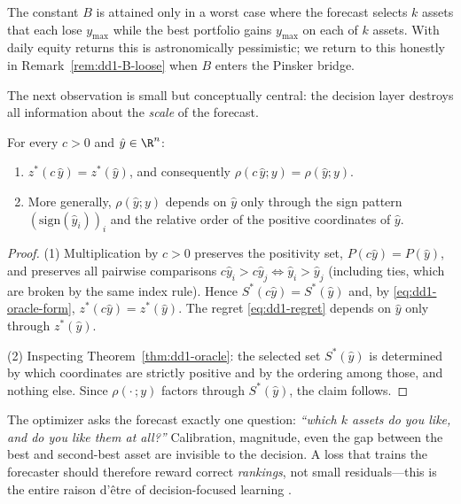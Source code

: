 \begin{remark}
The constant $B$ is attained only in a worst case where the forecast selects
$k$ assets that each lose $y_{\max}$ while the best portfolio gains $y_{\max}$
on each of $k$ assets. With daily equity returns this is astronomically
pessimistic; we return to this honestly in
Remark~\ref{rem:dd1-B-loose} when $B$ enters the Pinsker bridge.
\end{remark}

The next observation is small but conceptually central: the decision layer
destroys all information about the \emph{scale} of the forecast.

\begin{proposition}
\label{prop:dd1-scale-invariance}
For every $c > 0$ and $\hat{y} \in \R^n$:
\begin{enumerate}
\item $z^*(c\,\hat{y}) = z^*(\hat{y})$, and consequently
$\rho(c\,\hat{y}; y) = \rho(\hat{y}; y)$.
\item More generally, $\rho(\hat{y}; y)$ depends on $\hat{y}$ only through
the sign pattern $(\mathrm{sign}(\hat{y}_i))_{i}$ and the relative order of
the positive coordinates of $\hat{y}$.
\end{enumerate}
\end{proposition}

\begin{proof}
(1) Multiplication by $c > 0$ preserves the positivity set,
$P(c\hat{y}) = P(\hat{y})$, and preserves all pairwise comparisons
$c\hat{y}_i > c\hat{y}_j \iff \hat{y}_i > \hat{y}_j$ (including ties, which
are broken by the same index rule). Hence $S^*(c\hat{y}) = S^*(\hat{y})$ and,
by \eqref{eq:dd1-oracle-form}, $z^*(c\hat{y}) = z^*(\hat{y})$. The regret
\eqref{eq:dd1-regret} depends on $\hat{y}$ only through $z^*(\hat{y})$.

(2) Inspecting Theorem~\ref{thm:dd1-oracle}: the selected set $S^*(\hat{y})$
is determined by which coordinates are strictly positive and by the ordering
among those, and nothing else. Since $\rho(\cdot\,; y)$ factors through
$S^*(\hat{y})$, the claim follows.
\end{proof}

\begin{intuition}
The optimizer asks the forecast exactly one question: \emph{``which $k$ assets
do you like, and do you like them at all?''} Calibration, magnitude, even the
gap between the best and second-best asset are invisible to the decision. A
loss that trains the forecaster should therefore reward correct
\emph{rankings}, not small residuals---this is the entire raison d'\^etre of
decision-focused learning \cite{elmachtoub2022smart, shah2022lodl}.
\end{intuition}

